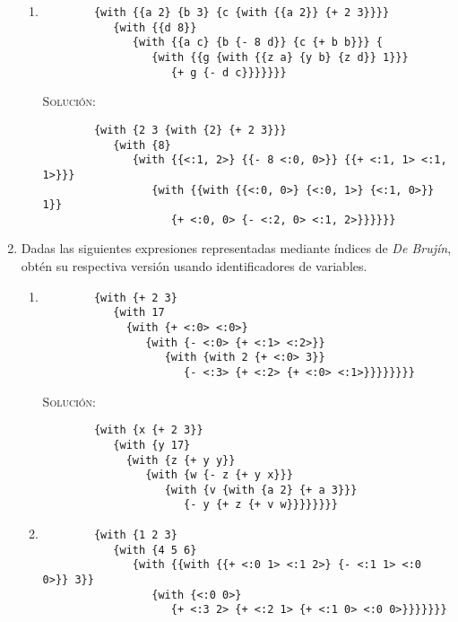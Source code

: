 \documentclass[letterpaper,11pt]{article}
\begin{document}
\begin{enumerate}
\begin{enumerate}
        \item 
        \begin{verbatim}
        {with {{a 2} {b 3} {c {with {{a 2}} {+ 2 3}}}} 
           {with {{d 8}} 
              {with {{a c} {b {- 8 d}} {c {+ b b}}} {
                 {with {{g {with {{z a} {y b} {z d}} 1}}} 
                    {+ g {- d c}}}}}}}
        \end{verbatim}

        \textsc{Solución:}
        \begin{verbatim}
        {with {2 3 {with {2} {+ 2 3}}} 
           {with {8} 
              {with {{<:1, 2>} {{- 8 <:0, 0>}} {{+ <:1, 1> <:1, 1>}}} 
                 {with {{with {{<:0, 0>} {<:0, 1>} {<:1, 0>}} 1}} 
                    {+ <:0, 0> {- <:2, 0> <:1, 2>}}}}}}
        \end{verbatim}
    \end{enumerate}

    \item Dadas las siguientes expresiones representadas mediante índices de 
    \textit{De Brujín}, obtén su respectiva versión usando identificadores de 
    variables.
    \begin{enumerate}
        \item 
        \begin{verbatim}
        {with {+ 2 3} 
           {with 17 
             {with {+ <:0> <:0>} 
                {with {- <:0> {+ <:1> <:2>}} 
                   {with {with 2 {+ <:0> 3}} 
                      {- <:3> {+ <:2> {+ <:0> <:1>}}}}}}}}
        \end{verbatim}

        \textsc{Solución:}
        \begin{verbatim}
        {with {x {+ 2 3}} 
           {with {y 17} 
             {with {z {+ y y}} 
                {with {w {- z {+ y x}}} 
                   {with {v {with {a 2} {+ a 3}}} 
                      {- y {+ z {+ v w}}}}}}}}
        \end{verbatim}

        \newpage
        \item 
        \begin{verbatim}
        {with {1 2 3} 
           {with {4 5 6} 
              {with {{with {{+ <:0 1> <:1 2>} {- <:1 1> <:0 0>}} 3}} 
              	 {with {<:0 0>}
                 	{+ <:3 2> {+ <:2 1> {+ <:1 0> <:0 0>}}}}}}}
        \end{verbatim}


\end{enumerate}
\end{enumerate}
\end{document}
